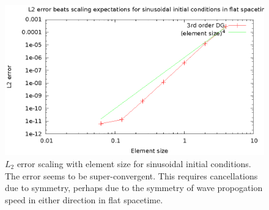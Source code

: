 \begin{figure}
  \includegraphics{sinL2WTelement}
  \caption{$L_2$ error scaling with element size for sinusoidal initial conditions. The error seems to be super-convergent. This requires cancellations due to symmetry, perhaps due to the symmetry of wave propogation speed in either direction in flat spacetime.}
  \label{scalingelement}
\end{figure}



